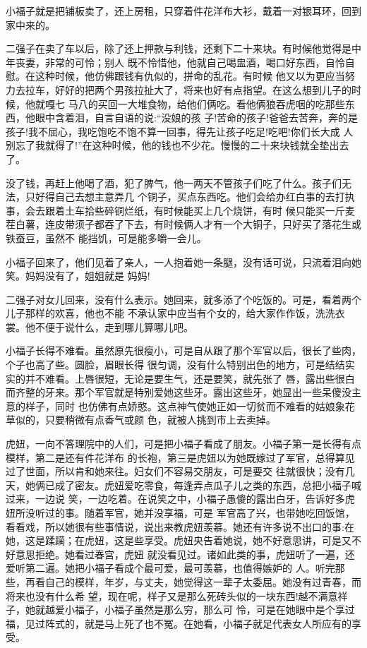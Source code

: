 \documentclass[11pt,a4paper,onecolumn]{article}
\begin{document}
小福子就是把铺板卖了，还上房租，只穿着件花洋布大衫，戴着一对银耳环，回到家中来的。

二强子在卖了车以后，除了还上押款与利钱，还剩下二十来块。有时候他觉得是中年丧妻，非常的可怜；别人
既不怜惜他，他就自己喝盅酒，喝口好东西，自怜自慰。在这种时候，他仿佛跟钱有仇似的，拼命的乱花。有时候
他又以为更应当努力去拉车，好好的把两个男孩拉扯大了，将来也好有点指望。在这么想到儿子的时候，他就嘎七
马八的买回一大堆食物，给他们俩吃。看他俩狼吞虎咽的吃那些东西，他眼中含着泪，自言自语的说:``没娘的孩
子!苦命的孩子!爸爸去苦奔，奔的是孩子!我不屈心，我吃饱吃不饱不算一回事，得先让孩子吃足!吃吧!你们长大成
人别忘了我就得了!''在这种时候，他的钱也不少花。慢慢的二十来块钱就全垫出去了。

没了钱，再赶上他喝了酒，犯了脾气，他一两天不管孩子们吃了什么。孩子们无法，只好得自己去想主意弄几
个铜子，买点东西吃。他们会给办红白事的去打执事，会去跟着土车拾些碎铜烂纸，有时候能买上几个烧饼，有时
候只能买一斤麦茬白薯，连皮带须子都吞了下去，有时候俩人才有一个大铜子，只好买了落花生或铁蚕豆，虽然不
能挡饥，可是能多嚼一会儿。

小福子回来了，他们见着了亲人，一人抱着她一条腿，没有话可说，只流着泪向她笑。妈妈没有了，姐姐就是
妈妈!

二强子对女儿回来，没有什么表示。她回来，就多添了个吃饭的。可是，看着两个儿子那样的欢喜，他也不能
不承认家中应当有个女的，给大家作作饭，洗洗衣裳。他不便于说什么，走到哪儿算哪儿吧。

小福子长得不难看。虽然原先很瘦小，可是自从跟了那个军官以后，很长了些肉，个子也高了些。圆脸，眉眼长得
很匀调，没有什么特别出色的地方，可是结结实实的并不难看。上唇很短，无论是要生气，还是要笑，就先张了
唇，露出些很白而齐整的牙来。那个军官就是特别爱她这些牙。露出这些牙，她显出一些呆傻没主意的样子，同时
也仿佛有点娇憨。这点神气使她\myrule 正如一切贫而不难看的姑娘\myrule 象花草似的，只要稍微有点香气或颜
色，就被人挑到市上去卖掉。

虎妞，一向不答理院中的人们，可是把小福子看成了朋友。小福子第一是长得有点模样，第二是还有件花洋布
的长袍，第三是虎妞以为她既嫁过了军官，总得算见过了世面，所以肯和她来往。妇女们不容易交朋友，可是要交
往就很快；没有几天，她俩已成了密友。虎妞爱吃零食，每逢弄点瓜子儿之类的东西，总把小福子喊过来，一边说
笑，一边吃着。在说笑之中，小福子愚傻的露出白牙，告诉好多虎妞所没听过的事。随着军官，她并没享福，可是
军官高了兴，也带她吃回饭馆，看看戏，所以她很有些事情说，说出来教虎妞羡慕。她还有许多说不出口的事:在
她，这是蹂躏；在虎妞，这是些享受。虎妞央告着她说，她不好意思讲，可是又不好意思拒绝。她看过春宫，虎妞
就没看见过。诸如此类的事，虎妞听了一遍，还爱听第二遍。她把小福子看成个最可爱，最可羡慕，也值得嫉妒的
人。听完那些，再看自己的模样，年岁，与丈夫，她觉得这一辈子太委屈。她没有过青春，而将来也没有什么希
望，现在呢，样子又是那么死砖头似的一块东西!越不满意祥子，她就越爱小福子，小福子虽然是那么穷，那么可
怜，可是在她眼中是个享过福，见过阵式的，就是马上死了也不冤。在她看，小福子就足代表女人所应有的享受。
\end{document}

